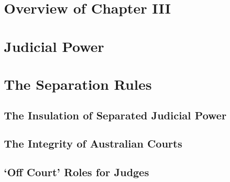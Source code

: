 \section{Overview of Chapter III}

\section{Judicial Power}

\section{The Separation Rules}

\subsection{The Insulation of Separated Judicial Power}

\subsection{The Integrity of Australian Courts}

\subsection{`Off Court' Roles for Judges}